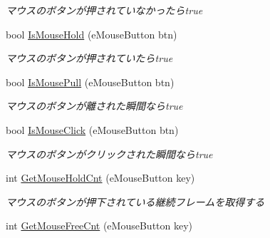 \begin{DoxyCompactItemize}
\begin{DoxyCompactList}\small\item\em マウスのボタンが押されていなかったらtrue \end{DoxyCompactList}\item 
bool \hyperlink{class_input_manager_afa182f53a9fb2461ebb25d0bf16addef}{Is\+Mouse\+Hold} (e\+Mouse\+Button btn)\hypertarget{class_input_manager_afa182f53a9fb2461ebb25d0bf16addef}{}\label{class_input_manager_afa182f53a9fb2461ebb25d0bf16addef}

\begin{DoxyCompactList}\small\item\em マウスのボタンが押されていたらtrue \end{DoxyCompactList}\item 
bool \hyperlink{class_input_manager_a4c3e08df40d0538f850f4d476643aeb7}{Is\+Mouse\+Pull} (e\+Mouse\+Button btn)\hypertarget{class_input_manager_a4c3e08df40d0538f850f4d476643aeb7}{}\label{class_input_manager_a4c3e08df40d0538f850f4d476643aeb7}

\begin{DoxyCompactList}\small\item\em マウスのボタンが離された瞬間ならtrue \end{DoxyCompactList}\item 
bool \hyperlink{class_input_manager_aac50cc157411461d9419925b777dfc90}{Is\+Mouse\+Click} (e\+Mouse\+Button btn)\hypertarget{class_input_manager_aac50cc157411461d9419925b777dfc90}{}\label{class_input_manager_aac50cc157411461d9419925b777dfc90}

\begin{DoxyCompactList}\small\item\em マウスのボタンがクリックされた瞬間ならtrue \end{DoxyCompactList}\item 
int \hyperlink{class_input_manager_a80cfed4ebb420ae2c9ea741b775a4673}{Get\+Mouse\+Hold\+Cnt} (e\+Mouse\+Button key)\hypertarget{class_input_manager_a80cfed4ebb420ae2c9ea741b775a4673}{}\label{class_input_manager_a80cfed4ebb420ae2c9ea741b775a4673}

\begin{DoxyCompactList}\small\item\em マウスのボタンが押下されている継続フレームを取得する \end{DoxyCompactList}\item 
int \hyperlink{class_input_manager_a5be0ced7a28a44e225ac7de50548bf93}{Get\+Mouse\+Free\+Cnt} (e\+Mouse\+Button key)\hypertarget{class_input_manager_a5be0ced7a28a44e225ac7de50548bf93}{}\label{class_input_manager_a5be0ced7a28a44e225ac7de50548bf93}


\end{DoxyCompactItemize}

